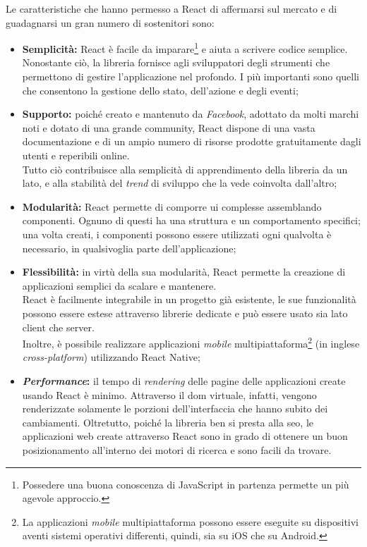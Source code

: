 Le caratteristiche che hanno permesso a React di affermarsi sul mercato e di guadagnarsi un gran numero di sostenitori sono:
\begin{itemize}
  \item \textbf{Semplicità:} React è facile da imparare\footnote{Possedere una buona conoscenza di JavaScript in partenza permette un più agevole approccio.} e aiuta a scrivere codice semplice. Nonostante ciò, la libreria fornisce agli sviluppatori degli strumenti che permettono di gestire l'applicazione nel profondo. I più importanti sono quelli che consentono la gestione dello stato, dell'azione e degli eventi;
  
  \item \textbf{Supporto:} poiché creato e mantenuto da \textit{Facebook}, adottato da molti marchi noti e dotato di una grande community, React dispone di una vasta documentazione e di un ampio numero di risorse prodotte gratuitamente dagli utenti e reperibili online.\\
  Tutto ciò contribuisce alla semplicità di apprendimento della libreria da un lato, e alla stabilità del \textit{trend} di sviluppo che la vede coinvolta dall'altro;
  
  \item \textbf{Modularità:} React permette di comporre \acrshort{ui} complesse assemblando componenti. Ognuno di questi ha una struttura e un comportamento specifici; una volta creati, i componenti possono essere utilizzati ogni qualvolta è necessario, in qualsivoglia parte dell’applicazione;
  
  \item \textbf{Flessibilità:} in virtù della sua modularità, React permette la creazione di applicazioni semplici da scalare e mantenere.\\
  React è facilmente integrabile in un progetto già esistente, le sue funzionalità possono essere estese attraverso librerie dedicate e può essere usato sia lato client che server.\\ 
  Inoltre, è possibile realizzare applicazioni \textit{mobile} multipiattaforma\footnote{La applicazioni \textit{mobile} multipiattaforma possono essere eseguite su dispositivi aventi sistemi operativi differenti, quindi, sia su iOS che su Android.} (in inglese \textit{cross-platform}) utilizzando React Native;
  
  \item \textbf{\textit{Performance}:} il tempo di \textit{rendering} delle pagine delle applicazioni create usando React è minimo. Attraverso il \gls{dom} virtuale, infatti, vengono renderizzate solamente le porzioni dell'interfaccia che hanno subito dei cambiamenti. Oltretutto, poiché la libreria ben si presta alla \gls{seo}, le applicazioni web create attraverso React sono in grado di ottenere un buon posizionamento all'interno dei motori di ricerca e sono facili da trovare.
\end{itemize}
